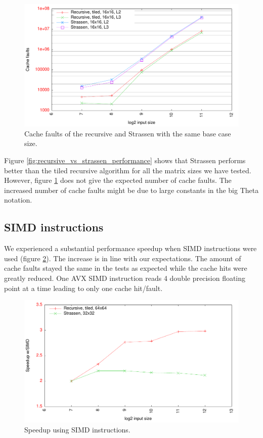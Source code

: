 \begin{figure}[h!]
  \centering
  \includegraphics[width=\textwidth]{"../project2/gnuplots/recursive_vs_strassen_cache"}
  \caption{Cache faults of the recursive and Strassen with the same base case size.}
  \label{fig:recursive_vs_strassen_cache}
\end{figure}

Figure \ref{fig:recursive_vs_strassen_performance} shows that Strassen performs better than the tiled recursive algorithm for all the matrix sizes we have tested. However, figure \ref{fig:recursive_vs_strassen_cache} does not give the expected number of cache faults. The increased number of cache faults might be due to large constants in the big Theta notation.

\subsection{SIMD instructions}

We experienced a substantial performance speedup when SIMD instructions were used (figure \ref{fig:simd}). The increase is in line with our expectations. The amount of cache faults stayed the same in the tests as expected while the cache hits were greatly reduced. One AVX SIMD instruction reads 4 double precision floating point at a time leading to only one cache hit/fault.

\begin{figure}[h!]
  \centering
  \includegraphics[width=\textwidth]{"../project2/gnuplots/simd_performance"}
  \caption{Speedup using SIMD instructions.}
  \label{fig:simd}
\end{figure}

